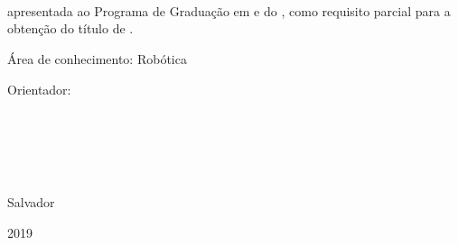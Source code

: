\begin{folharosto}

\begin{center}
\theauthor \\
\theauthorr \\
\theauthorrr \\
\theauthorrrr \\
\theauthorrrrr \\
\end{center}
\ \\
\ \\
\ \\
\ \\
\ \\
\begin{spacing}{2}
   \begin{center}
   {\LARGE {\bf \thetitle}}
   \end{center}
\end{spacing}
\ \\
\ \\
\ \\
\begin{flushright}

   \begin{list}{}{
      \setlength{\leftmargin}{7.5cm}
      \setlength{\rightmargin}{0cm}
      \setlength{\labelwidth}{0pt}
      \setlength{\labelsep}{\leftmargin}}

      \item \thetypework apresentada ao Programa de Graduação em \thecourse e \thecoursee
      do \theuniversity, como requisito parcial para a obten\c{c}\~ao do
      t\'itulo de {\bf \thedegreetitle}.

      \begin{list}{}{
      \setlength{\leftmargin}{0cm}
      \setlength{\rightmargin}{0cm}
      \setlength{\labelwidth}{0pt}
      \setlength{\labelsep}{\leftmargin}}

      \item \'Area de conhecimento: Robótica

      \item Orientador: \theadvisor
      \newline \hspace*{2.1cm}  %

      \end{list}
   \end{list}

\end{flushright}
\ \\
\ \\
\ \\
\ \\
   \begin{center}
   Salvador \par
   \theuniversity \par
   2019
   \end{center}

\end{folharosto}
